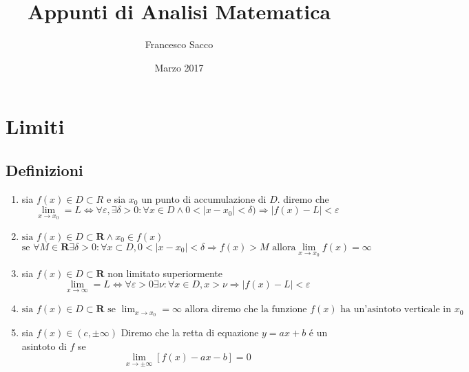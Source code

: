 \documentclass{exam}
\date{Marzo 2017}
\title{Appunti di Analisi Matematica}
\author{Francesco Sacco}
\begin{document}
\section{Limiti}
  \subsection{Definizioni}
    \begin{enumerate}
      \item 
        sia $f(x) \in D\subset R$ e sia $x_{0}$ un punto di accumulazione di $D$. diremo che
        \begin{displaymath}
          \lim_{x \to x_{0}}=L\Leftrightarrow \forall \varepsilon , \exists \delta > 0 :
          \forall x \in D \land 0<|x-x_{0}|< \delta) \Rightarrow |f(x)-L|<\varepsilon
        \end{displaymath}
      \item
        $\textrm{sia } f(x) \in D \subset \mathbf{R} \land x_{0}\in f(x) $
        \begin{displaymath}
          \textrm{se } \forall M \in \mathbf{R} \exists \delta >0: \forall x \subset D , 
          0<|x-x_{0}|<\delta \Rightarrow f(x)>M
          \textrm{ allora} \lim_{x \to x_{0}}f(x)=\infty
        \end{displaymath}
      \item 
        sia $f(x) \in D \subset \mathbf{R}$ non limitato superiormente
        \begin{displaymath}
          \lim_{x \to \infty}=L \Leftrightarrow 
          \forall \varepsilon>0 \exists \nu:\forall x\in D,
          x>\nu \Rightarrow |f(x)-L|<\varepsilon
        \end{displaymath}
      \item
        \(\displaystyle
          \textrm{sia } f(x) \in D\subset \mathbf{R}
          \textrm{ se }\lim_{x\to x_{0}}=\infty \textrm{ allora diremo che la funzione }f(x) 
          \textrm{ ha un'asintoto verticale in }x_{0}
        \)
      \item 
        sia $f(x)\in (c, \pm \infty)$ Diremo che la retta di equazione $y=ax+b$
        \'e un asintoto di $f$ se
          \begin{displaymath}
            \lim_{x\to \pm \infty}[f(x)-ax-b]=0
          \end{displaymath}
    \end{enumerate}
  
  
  
\end{document}
